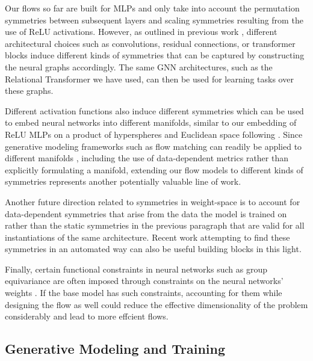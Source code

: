 Our flows so far are built for MLPs and only take into account the permutation symmetries between subsequent layers and scaling symmetries resulting from the use of ReLU activations. However, as outlined in previous work \citep{kofinasGraphNeuralNetworks2024,limGraphMetanetworksProcessing2023}, different architectural choices such as convolutions, residual connections, or transformer blocks induce different kinds of symmetries that can be captured by constructing the neural graphs accordingly. The same GNN architectures, such as the Relational Transformer we have used, can then be used for learning tasks over these graphs. 

Different activation functions also induce different symmetries \citep{godfreySymmetriesDeepLearning2022} which can be used to embed neural networks into different manifolds, similar to our embedding of ReLU MLPs on a product of hyperspheres and Euclidean space following \citep{pittorinoDeepNetworksToroids2022}. Since generative modeling frameworks such as flow matching can readily be applied to different manifolds \citep{chenRiemannianFlowMatching2023}, including the use of data-dependent metrics \citep{kapusniakMetricFlowMatching2024} rather than explicitly formulating a manifold, extending our flow models to different kinds of symmetries represents another potentially valuable line of work. 

Another future direction related to symmetries in weight-space is to account for data-dependent symmetries \citep{zhaoSymmetriesFlatMinima2023} that arise from the data the model is trained on rather than the static symmetries in the previous paragraph that are valid for all instantiations of the same architecture. Recent work attempting to find these symmetries in an automated way \citep{zhaoFindingSymmetryNeural2024} can also be useful building blocks in this light. 

Finally, certain functional constraints in neural networks such as group equivariance are often imposed through constraints on the neural networks' weights \citep{weilerEquivariantCoordinateIndependent2023}. If the base model has such constraints, accounting for them while designing the flow as well could reduce the effective dimensionality of the problem considerably and lead to more effcient flows. 

\subsection{Generative Modeling and Training}

